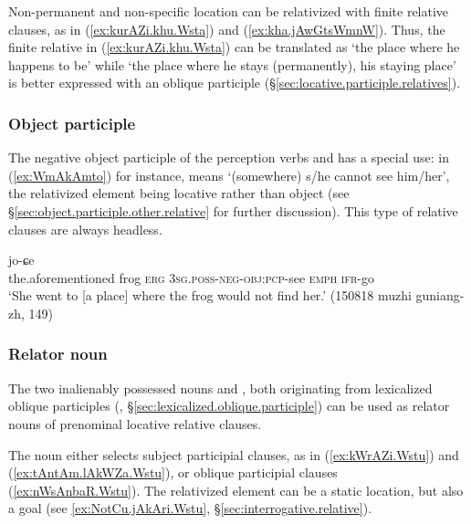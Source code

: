Non-permanent and non-specific location can be relativized with finite relative clauses, as in (\ref{ex:kurAZi.khu.Wsta}) and (\ref{ex:kha.jAwGtsWmnW}). Thus, the finite relative  in (\ref{ex:kurAZi.khu.Wsta}) can be translated as `the place where he happens to be' while `the place where he stays (permanently), his staying place' is better expressed with an oblique participle  (§\ref{sec:locative.participle.relatives}).
 
\subsubsection{Object participle} \label{sec:locative.relativization.object}
The negative object participle of the perception verbs  and  has a special use: in (\ref{ex:WmAkAmto}) for instance,  means `(somewhere) s/he cannot see him/her', the relativized element being locative rather than object  (see §\ref{sec:object.participle.other.relative} for further discussion). This type of relative clauses are always headless.

\begin{exe}
\ex \label{ex:WmAkAmto}
 jo-ɕe  \\
the.aforementioned frog \textsc{erg} \textsc{3sg}.\textsc{poss}-\textsc{neg}-\textsc{obj}:\textsc{pcp}-see \textsc{emph} \textsc{ifr}-go   \\
\glt `She went to [a place] where the frog would not find her.' (150818 muzhi guniang-zh, 149)
\end{exe}

\subsubsection{Relator noun} \label{sec:Wstu.relativization.subject}
The two inalienably possessed nouns   and , both originating from lexicalized oblique participles (, §\ref{sec:lexicalized.oblique.participle}) can be used as relator nouns of prenominal locative relative clauses.

The noun  either selects subject participial clauses, as in (\ref{ex:kWrAZi.Wstu}) and (\ref{ex:tAntAm.lAkWZa.Wstu}), or oblique participial clauses (\ref{ex:nWsAnbaR.Wstu}). The relativized element can be a static location, but also a goal (see \ref{ex:NotCu.jAkAri.Wstu}, §\ref{sec:interrogative.relative}).
 
